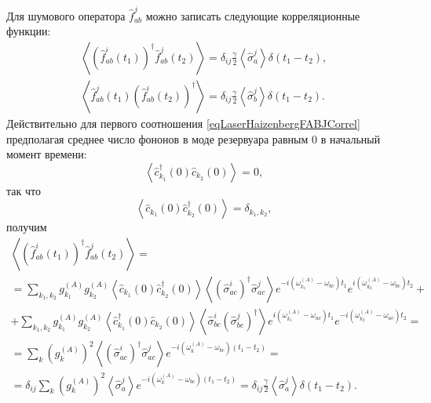 Для шумового оператора $\hat{f}_{ab}^{j}$ можно записать следующие
корреляционные функции:
\begin{eqnarray}
\left<\left(\hat{f}_{ab}^{i}\left(t_1\right)\right)^{\dag}\hat{f}_{ab}^{j}\left(t_2\right)\right>
= \delta_{ij}
\frac{\gamma}{2}\left<\hat{\sigma}^{j}_{a}\right>\delta\left(t_1 -
t_2\right),
\nonumber \\
\left<\hat{f}_{ab}^{j}\left(t_1\right)\left(\hat{f}_{ab}^{i}\left(t_2\right)\right)^{\dag}\right>
= \delta_{ij}
\frac{\gamma}{2}\left<\hat{\sigma}^{j}_{b}\right>\delta\left(t_1 -
t_2\right).
\label{eqLaserHaizenbergFABJCorrel}
\end{eqnarray}
Действительно для первого соотношения
\eqref{eqLaserHaizenbergFABJCorrel} предполагая среднее число фононов
в моде резервуара равным $0$ в начальный момент времени:
\begin{equation}
\left<\hat{c}_{k_1}^{\dag}\left(0\right)\hat{c}_{k_2}\left(0\right)\right>
= 0,
\nonumber
\end{equation}
так что
\begin{equation}
\left<\hat{c}_{k_1}\left(0\right)\hat{c}_{k_2}^{\dag}\left(0\right)\right>
= \delta_{k_1,k_2},
\nonumber
\end{equation}
получим
\begin{eqnarray}
\left<\left(\hat{f}_{ab}^{i}\left(t_1\right)\right)^{\dag}\hat{f}_{ab}^{j}\left(t_2\right)\right>
= 
\nonumber \\
=
\sum_{k_1,k_2}
g_{k_1}^{(A)}g_{k_2}^{(A)}
\left<\hat{c}_{k_1}\left(0\right)\hat{c}_{k_2}^{\dag}\left(0\right)\right>
\left<\left(\hat{\sigma}^{i}_{ac}\right)^{\dag}\hat{\sigma}^{j}_{ac}\right>  
e^{- i\left(\omega_{k_1}^{(A)} - \omega_{bc}\right)t_1}
e^{i\left(\omega_{k_2}^{(A)} - \omega_{bc}\right)t_2} +
\nonumber \\
+
\sum_{k_1,k_2}
g_{k_1}^{(A)}g_{k_2}^{(A)}
\left<\hat{c}_{k_1}^{\dag}\left(0\right)\hat{c}_{k_2}\left(0\right)\right>
\left<\hat{\sigma}^{i}_{bc}\left(\hat{\sigma}^{j}_{bc}\right)^{\dag}\right>
e^{i\left(\omega_{k_1}^{(A)} -
  \omega_{ac}\right)t_1}e^{-i\left(\omega_{k_2}^{(A)} -
  \omega_{ac}\right)t_2} = 
\nonumber \\
= 
\sum_{k}
\left(g_{k}^{(A)}\right)^2
\left<\left(\hat{\sigma}^{i}_{ac}\right)^{\dag}\hat{\sigma}^{j}_{ac}\right>  
e^{- i\left(\omega_{k}^{(A)} - \omega_{bc}\right)\left(t_1 -
  t_2\right)} = 
\nonumber \\
=
\delta_{ij}
\sum_{k}
\left(g_{k}^{(A)}\right)^2 
\left<\hat{\sigma}^{j}_{a}\right>  
e^{- i\left(\omega_{k}^{(A)} - \omega_{bc}\right)\left(t_1 -
  t_2\right)} = 
\delta_{ij}
\frac{\gamma}{2}\left<\hat{\sigma}^{j}_{a}\right>\delta\left(t_1 - t_2\right).
\nonumber
\end{eqnarray}


